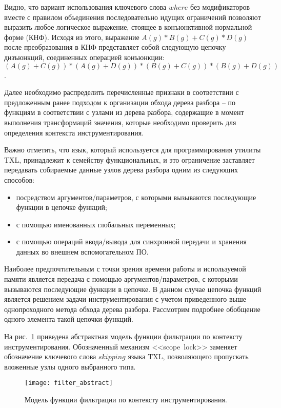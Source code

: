 Видно, что вариант использования ключевого слова $where$ без модификаторов вместе с правилом объединения последовательно идущих ограничений позволяют выразить любое логическое выражение, стоящее в конъюнктивной нормальной форме (КНФ).
Исходя из этого, выражение $A(g) * B(g) + C(g) * D(g)$ после преобразования в КНФ представляет собой следующую цепочку дизъюнкций, соединенных операцией конъюнкции: $(A(g) + C(g)) * (A(g) + D(g)) * (B(g) + C(g)) * (B(g) + D(g))$.

Далее необходимо распределить перечисленные признаки в соответствии с предложенным ранее подходом к организации обхода дерева разбора -- по функциям в соответствии с узлами из дерева разбора, содержащие в момент выполнения трансформаций значения, которые необходимо проверить для определения контекста инструментирования.

Важно отметить, что язык, который используется для программирования утилиты TXL, принадлежит к семейству функциональных, и это ограничение заставляет передавать собираемые данные узлов дерева разбора одним из следующих способов:
\begin{itemize}[noitemsep]
  \item посредством аргументов/параметров, с которыми вызываются последующие функции в цепочке функций;
  \item с помощью именованных глобальных переменных;
  \item с помощью операций ввода/вывода для синхронной передачи и хранения данных во внешнем вспомогательном ПО.
\end{itemize}

Наиболее предпочтительным с точки зрения времени работы и используемой памяти является передача с помощью аргументов/параметров, с которыми вызываются последующие функции в цепочке.
В данном случае цепочка функций является решением задачи инструментирования с учетом приведенного выше однопроходного метода обхода дерева разбора.
Рассмотрим подробнее обобщение одного элемента такой цепочки функций.

На рис.~\ref{fig:filter_abstract} приведена абстрактная модель функции фильтрации по контексту инструментирования.
Обозначенный механизм <<scope~lock>> заменяет обозначение ключевого слова $skipping$ языка TXL, позволяющего пропускать вложенные узлы одного выбранного типа.

\begin{figure}[!h]
	\centering
	\texttt{[image: filter\_abstract]}
	\caption{Модель функции фильтрации по контексту инструментирования.}
	\label{fig:filter_abstract}
\end{figure}

